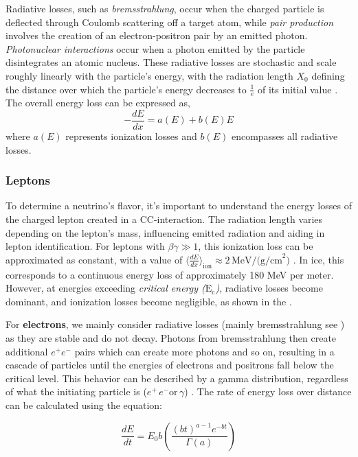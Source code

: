 Radiative losses, such as \emph{bremsstrahlung}, occur when the charged particle is deflected through Coulomb scattering off a target atom, while \emph{pair production} involves the creation of an electron-positron pair by an emitted photon. \emph{Photonuclear interactions} occur when a photon emitted by the particle disintegrates an atomic nucleus. These radiative losses are stochastic and scale roughly linearly with the particle's energy, with the radiation length $ X_0 $ defining the distance over which the particle’s energy decreases to $ \frac{1}{e} $ of its initial value \cite{PDG_2024}. The overall energy loss can be expressed as, 
\begin{equation}\label{eq:1}
    -\frac{dE}{dx} = a(E) + b(E)E 
\end{equation}
where $a(E)$ represents ionization losses and $b(E)$ encompasses all radiative losses.

\subsubsection{Leptons}
\label{sec:leptons_inice}
To determine a neutrino's flavor, it's important to understand the energy losses of the charged lepton created in a CC-interaction. The radiation length varies depending on the lepton's mass, influencing emitted radiation and aiding in lepton identification. For leptons with $ \beta\gamma \gg 1 $, this ionization loss can be approximated as constant, with a value of $\langle \frac{dE}{dx} \rangle_{\text{ion}} \approx 2 \, \text{MeV/(g/cm}^2)$ . In ice, this corresponds to a continuous energy loss of approximately 180 MeV per meter. However, at energies exceeding \emph{critical energy ($\mathrm{E}_\mathrm{c}$)}, radiative losses become dominant, and ionization losses become negligible, as shown in the  . 

For \textbf{electrons}, we mainly consider radiative losses (mainly bremsstrahlung see ) as they are stable and do not decay. Photons from bremsstrahlung then create additional $e^+e^-$ pairs which can create more photons and so on, resulting in a cascade of particles until the energies of electrons and positrons fall below the critical level. This behavior can be described by a gamma distribution, regardless of what the initiating particle is ($e^+ \, e^- \mathrm{or} \, \gamma$) \cite{PDG_2024}. The rate of energy loss over distance can be calculated using the equation:

\begin{equation}\label{eq:2}
    \frac{dE}{dt} = E_0 b \left( \frac{(bt)^{a-1} e^{-bt}}{\Gamma(a)} \right)
\end{equation}

